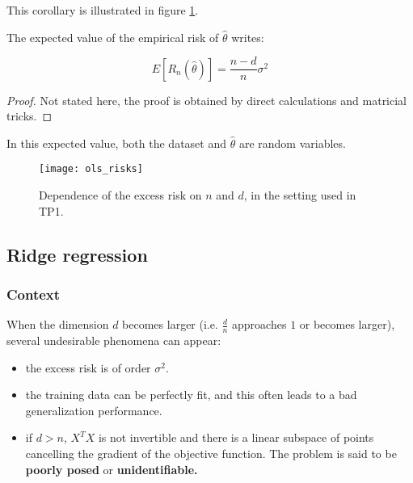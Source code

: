 \documentclass[
10pt, %
a4paper, %
oneside, %
headinclude,footinclude, %
BCOR5mm, %
]{scrartcl}
\begin{document}
This corollary is illustrated in figure \ref{fig:olsrisk}.

\begin{proposition}
    The expected value of the empirical risk of $ \hat{\theta}$ writes:

    \begin{equation}
	E[ R_n( \hat{\theta})] = \frac{n-d}{n} \sigma^2
    \end{equation}
\end{proposition}

\begin{proof}
Not stated here, the proof is obtained by direct calculations and matricial tricks.
\end{proof}

\begin{remark}
    In this expected value, both the dataset and $ \hat{\theta}$ are random variables.
\end{remark}

\begin{figure}[htpb]
    \centering
    \texttt{[image: ols\_risks]}
    \caption{Dependence of the excess risk on $n$ and $d$, in the setting used
    in TP1.}
    \label{fig:olsrisk}
\end{figure}

\subsection{\large\color{MidnightBlue}Ridge regression}

\subsubsection{\large\color{Periwinkle}Context}

When the dimension $d$ becomes larger (i.e. $ \frac{d}{n} $ approaches $1$ or becomes larger), several undesirable phenomena can appear:
\begin{itemize}
    \item the excess risk is of order $ \sigma^2$.
    \item the training data can be perfectly fit, and this often leads to a bad generalization performance.
    \item if $d>n$, $X^TX$ is not invertible and there is a linear subspace of points cancelling the gradient of the objective function. The problem is said to be \textbf{{poorly posed}} or \textbf{{unidentifiable.}}
\end{itemize}
\end{document}

